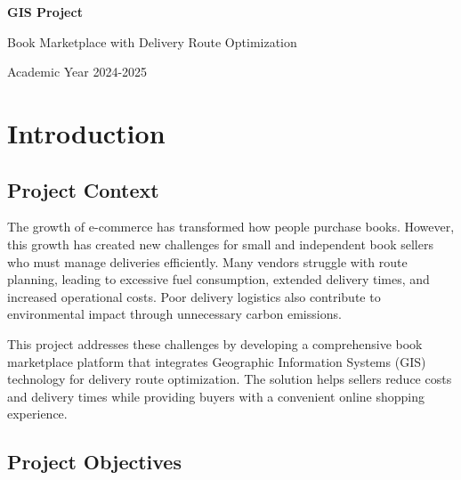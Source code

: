 \documentclass[12pt,a4paper]{article}
\begin{document}
\begin{titlepage}
    \centering
    \vspace*{2cm}

    {\Huge\bfseries GIS Project\par}
    \vspace{1cm}
    {\LARGE Book Marketplace with Delivery Route Optimization\par}

    \vspace{2cm}

    \begin{figure}[h]
        \centering
    \end{figure}

    \vfill

    {\large Academic Year 2024-2025\par}
\end{titlepage}

\tableofcontents
\newpage

\section{Introduction}

\subsection{Project Context}

The growth of e-commerce has transformed how people purchase books. However, this growth has created new challenges for small and independent book sellers who must manage deliveries efficiently. Many vendors struggle with route planning, leading to excessive fuel consumption, extended delivery times, and increased operational costs. Poor delivery logistics also contribute to environmental impact through unnecessary carbon emissions.

This project addresses these challenges by developing a comprehensive book marketplace platform that integrates Geographic Information Systems (GIS) technology for delivery route optimization. The solution helps sellers reduce costs and delivery times while providing buyers with a convenient online shopping experience.

\subsection{Project Objectives}
\end{document}
